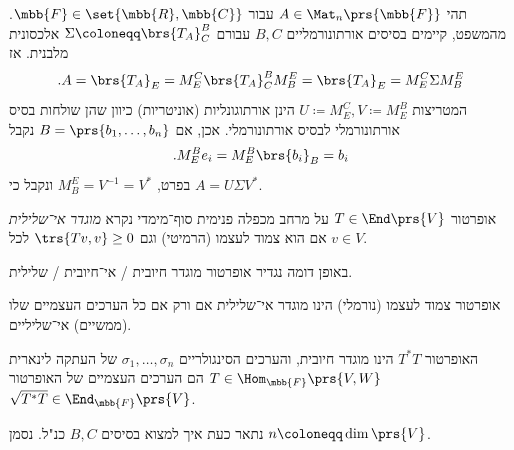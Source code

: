 \documentclass[a4paper,10pt,twoside,openany]{book}
\begin{document}
\begin{corollary} \label{corollary:matrix-svd}
תהי
$A \in \Mat_{n}\prs{\mbb{F}}$
עבור
$\mbb{F} \in \set{\mbb{R}, \mbb{C}}$.
מהמשפט, קיימים בסיסים אורתונורמליים
$B,C$
עבורם
$\Sigma \coloneqq \brs{T_A}^B_C$
אלכסונית מלבנית.
אז
\[\text{.} A = \brs{T_A}_E = M^C_E \brs{T_A}^B_C M^E_B = \brs{T_A}_E = M^C_E \Sigma M^E_B\]
המטריצות
$U \coloneqq M^C_E, V \coloneqq M^B_E$
הינן אורתוגונליות (אוניטריות) כיוון שהן שולחות בסיס אורתונורמלי לבסיס אורתונורמלי. אכן, אם
$B = \prs{b_1, \ldots, b_n}$
נקבל
\[\text{.} M^B_E e_i = M^B_E \brs{b_i}_B = b_i\]
בפרט,
$M^E_B = V^{-1} = V^*$
ונקבל כי
$A = U \Sigma V^*$.
\end{corollary}

\begin{definition}
אופרטור
$T \in \End\prs{V}$
על מרחב מכפלה פנימית סוף־מימדי נקרא
\emph{מוגדר אי־שלילית}
אם הוא צמוד לעצמו (הרמיטי) וגם
$\trs{Tv, v} \geq 0$
לכל
$v \in V$.
\end{definition}

\begin{remark}
באופן דומה נגדיר אופרטור מוגדר חיובית%
\slash%
אי־חיובית%
\slash
שלילית.
\end{remark}

\begin{proposition}
אופרטור צמוד לעצמו (נורמלי) הינו מוגדר אי־שלילית אם ורק אם כל הערכים העצמיים שלו (ממשיים) אי־שליליים.
\end{proposition}

\begin{proposition}
האופרטור
$T^* T$
הינו מוגדר חיובית, והערכים הסינגולריים
$\sigma_1, \ldots, \sigma_n$
של העתקה לינארית
$T \in \Hom_{\mbb{F}}\prs{V,W}$
הם הערכים העצמיים של האופרטור
$\sqrt{T^* T} \in \End_{\mbb{F}}\prs{V}$.
\end{proposition}

נתאר כעת איך למצוא בסיסים
$B,C$
כנ"ל.
נסמן
$n \coloneqq \dim \prs{V}$.
\end{document}
